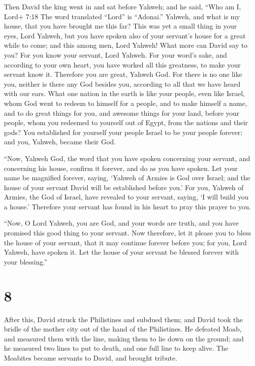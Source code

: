  Then David the king went in and sat before Yahweh; and he
said, ``Who am I, Lord+ 7:18 The word translated ``Lord'' is ``Adonai.''
Yahweh, and what is my house, that you have brought me this far?
 This was yet a small thing in your eyes, Lord Yahweh, but
you have spoken also of your servant's house for a great while to come;
and this among men, Lord Yahweh!  What more can David say
to you? For you know your servant, Lord Yahweh.  For your
word's sake, and according to your own heart, you have worked all this
greatness, to make your servant know it.  Therefore you are
great, Yahweh God. For there is no one like you, neither is there any
God besides you, according to all that we have heard with our ears.
 What one nation in the earth is like your people, even
like Israel, whom God went to redeem to himself for a people, and to
make himself a name, and to do great things for you, and awesome things
for your land, before your people, whom you redeemed to yourself out of
Egypt, from the nations and their gods?  You established
for yourself your people Israel to be your people forever; and you,
Yahweh, became their God.

 ``Now, Yahweh God, the word that you have spoken
concerning your servant, and concerning his house, confirm it forever,
and do as you have spoken.  Let your name be magnified
forever, saying, `Yahweh of Armies is God over Israel; and the house of
your servant David will be established before you.'  For
you, Yahweh of Armies, the God of Israel, have revealed to your servant,
saying, `I will build you a house.' Therefore your servant has found in
his heart to pray this prayer to you.

 ``Now, O Lord Yahweh, you are God, and your words are
truth, and you have promised this good thing to your servant.
 Now therefore, let it please you to bless the house of
your servant, that it may continue forever before you; for you, Lord
Yahweh, have spoken it. Let the house of your servant be blessed forever
with your blessing.''

\hypertarget{section-7}{%
\section{8}\label{section-7}}

 After this, David struck the Philistines and subdued them;
and David took the bridle of the mother city out of the hand of the
Philistines.  He defeated Moab, and measured them with the
line, making them to lie down on the ground; and he measured two lines
to put to death, and one full line to keep alive. The Moabites became
servants to David, and brought tribute.

